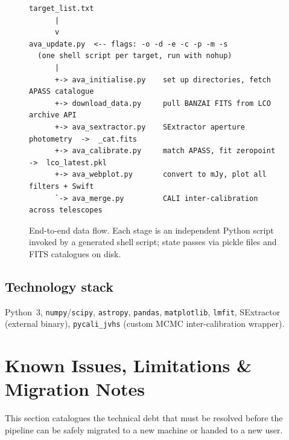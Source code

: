\documentclass[12pt,a4paper]{article}
\begin{document}
\begin{figure}[h!]
\centering
\begin{minipage}{0.85\linewidth}
\begin{lstlisting}[style=shell]
target_list.txt
      |
      v
ava_update.py  <-- flags: -o -d -e -c -p -m -s
  (one shell script per target, run with nohup)
      |
      +-> ava_initialise.py    set up directories, fetch APASS catalogue
      +-> download_data.py     pull BANZAI FITS from LCO archive API
      +-> ava_sextractor.py    SExtractor aperture photometry  ->  _cat.fits
      +-> ava_calibrate.py     match APASS, fit zeropoint  ->  lco_latest.pkl
      +-> ava_webplot.py       convert to mJy, plot all filters + Swift
      `-> ava_merge.py         CALI inter-calibration across telescopes
\end{lstlisting}
\end{minipage}
\caption{End-to-end data flow.  Each stage is an independent Python script
  invoked by a generated shell script; state passes via pickle files and FITS
  catalogues on disk.}
\label{fig:flow}
\end{figure}

\subsection{Technology stack}
Python~3, \texttt{numpy}/\texttt{scipy}, \texttt{astropy}, \texttt{pandas},
\texttt{matplotlib}, \texttt{lmfit}, SExtractor (external binary),
\texttt{pycali\_jvhs} (custom MCMC inter-calibration wrapper).


\section{Known Issues, Limitations \& Migration Notes}
\label{sec:issues}

This section catalogues the technical debt that must be resolved before the pipeline can
be safely migrated to a new machine or handed to a new user.
\end{document}
